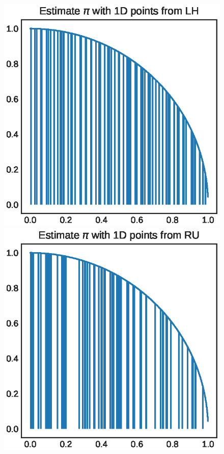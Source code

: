 \documentclass[shortabstract]{iithesis}
\begin{document}
\begin{figure}[!ht]
    \includegraphics[scale=.6]{LH_1D_circle.eps}
    \includegraphics[scale=.6]{RU_1D_circle.eps}
    

\end{figure}
\end{document}
